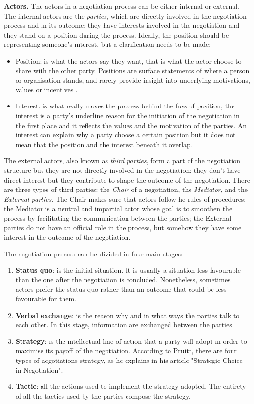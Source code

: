 \documentclass[../main.tex]{subfiles}
\begin{document}
\textbf{Actors.} The actors in a negotiation process can be either internal or external. The internal actors are the \textit{parties}, which are directly involved in the negotiation process and in its outcome: they have interests involved in the negotiation and they stand on a position during the process. Ideally, the position should be representing someone's interest, but a clarification needs to be made:
\begin{itemize}
\item Position: is what the actors say they want, that is what the actor choose to share with the other party. Positions are surface statements of where a person or organisation stands, and rarely provide insight into underlying motivations, values or incentives \autocite[]{watershed}.
\item Interest: is what really moves the process behind the fuss of position; the interest is a party's underline reason for the initiation of the negotiation in the first place and it reflects the values and the motivation of the parties. An interest can explain why a party choose a certain position but it does not mean that the position and the interest beneath it overlap.
\end{itemize}
The external actors, also known as \textit{third parties}, form a part of the negotiation structure but they are not directly involved in the negotiation: they don't have direct interest but they contribute to shape the outcome of the negotiation. There are three types of third parties: the \textit{Chair} of a negotiation, the \textit{Mediator}, and the \textit{External parties}. The Chair makes sure that actors follow he rules of procedures; the Mediator is a neutral and impartial actor whose goal is to smoothen the process by facilitating the communication between the parties; the External parties do not have an official role in the process, but somehow they have some interest in the outcome of the negotiation.

The negotiation process can be divided in four main stages:
\begin{enumerate}
\item \textbf{Status quo}: is the initial situation. It is usually a situation less favourable than the one after the negotiation is concluded. Nonetheless, sometimes actors prefer the status quo rather than an outcome that could be less favourable for them.
\item \textbf{Verbal exchange}: is the reason why and in what ways the parties talk to each other. In this stage, information are exchanged between the parties.
\item \textbf{Strategy}: is the intellectual line of action that a party will adopt in order to maximise its payoff of the negotiation. According to Pruitt, there are four types of negotiations strategy, as he explains in his article "Strategic Choice in Negotiation"\autocite[167]{pruitt}.
\item \textbf{Tactic}: all the actions used to implement the strategy adopted. The entirety of all the tactics used by the parties compose the strategy.
\end{enumerate}
\end{document}
